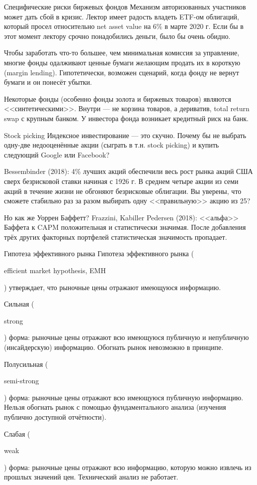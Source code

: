 \documentclass{beamer}
\newcommand{\en}[1]{\begin{otherlanguage}{english}#1\end{otherlanguage}}
\begin{document}
\begin{frame}{Специфические риски биржевых фондов}
\justify
Механизм авторизованных участников может дать сбой в кризис. Лектор имеет 
радость владеть ETF-ом облигаций, который просел относительно net asset value 
на 6\% в марте 2020 г. Если бы в этот момент лектору срочно понадобились 
деньги, было бы очень обидно.

\justify
Чтобы заработать что-то большее, чем минимальная комиссия за управление, многие 
фонды одалживают ценные бумаги желающим продать их в короткую (margin lending). 
Гипотетически, возможен сценарий, когда фонду не вернут бумаги и он понесёт 
убытки.

\justify
Некоторые фонды (особенно фонды золота и биржевых товаров) являются 
<<синтетическими>>. Внутри --- не корзина товаров, а дериватив, total return 
swap с крупным банком. У инвестора фонда возникает кредитный риск на банк.
\end{frame}



\begin{frame}{Stock picking}
\justify
Индексное инвестирование --- это скучно. Почему бы не выбрать одну-две 
недооценённые акции (сыграть в т.н. stock picking) и купить следующий Google 
или Facebook?

\justify
Bessembinder (2018): 4\% лучших акций обеспечили весь рост рынка акций США 
сверх безрисковой ставки начиная с 1926 г. В среднем четыре акции из семи акций 
в течение жизни не обгоняют безрисковые облигации. Вы уверены, что сможете 
стабильно раз за разом выбирать одну <<правильную>> акцию из 25?

\justify
Но как же Уоррен Баффетт? Frazzini, Kabiller Pedersen (2018): <<альфа>> Баффета 
к CAPM положительная и статистически значимая. После добавления трёх других 
факторных портфелей статистическая значимость пропадает.
\end{frame}



\begin{frame}{Гипотеза эффективного рынка}
\justify
Гипотеза эффективного рынка (\en{efficient market hypothesis, EMH}) утверждает,
что рыночные цены отражают имеющуюся информацию.

\justify
Сильная (\en{strong}) форма: рыночные цены отражают всю имеющуюся публичную
и непубличную (инсайдерскую) информацию. Обогнать рынок невозможно в принципе.

\justify
Полусильная (\en{semi-strong}) форма: рыночные цены отражают всю имеющуюся 
публичную информацию. Нельзя обогнать рынок с помощью фундаментального анализа
(изучения публично доступной отчётности).

\justify
Слабая (\en{weak}) форма: рыночные цены отражают всю информацию, которую можно
извлечь из прошлых значений цен. Технический анализ не работает.
\end{frame}
\end{document}
